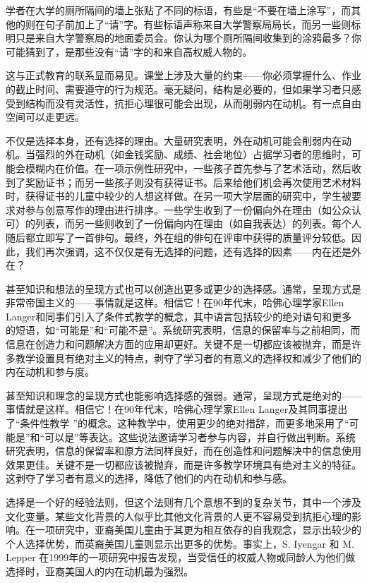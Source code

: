 学者在大学的厕所隔间的墙上张贴了不同的标语，有些是“不要在墙上涂写”，而其他的则在句子前加上了“请”字。有些标语声称来自大学警察局局长，而另一些则标明只是来自大学警察局的地面委员会。你认为哪个厕所隔间收集到的涂鸦最多？你可能猜到了，是那些没有“请”字的和来自高权威人物的。

这与正式教育的联系显而易见。课堂上涉及大量的约束——你必须掌握什么、作业的截止时间、需要遵守的行为规范。毫无疑问，结构是必要的，但如果学习者只感受到结构而没有灵活性，抗拒心理很可能会出现，从而削弱内在动机。有一点自由空间可以走更远。

不仅是选择本身，还有选择的理由。大量研究表明，外在动机可能会削弱内在动机。当强烈的外在动机（如金钱奖励、成绩、社会地位）占据学习者的思维时，可能会模糊内在价值。在一项示例性研究中，一些孩子首先参与了艺术活动，然后收到了奖励证书；而另一些孩子则没有获得证书。后来给他们机会再次使用艺术材料时，获得证书的儿童中较少的人想这样做。在另一项大学层面的研究中，学生被要求对参与创意写作的理由进行排序。一些学生收到了一份偏向外在理由（如公众认可）的列表，而另一些则收到了一份偏向内在理由（如自我表达）的列表。每个人随后都立即写了一首俳句。最终，外在组的俳句在评审中获得的质量评分较低。因此，我们再次强调，这不仅仅是有无选择的问题，还有选择的因素——内在还是外在？

甚至知识和想法的呈现方式也可以创造出更多或更少的选择感。通常，呈现方式是非常帝国主义的——事情就是这样。相信它！在90年代末，哈佛心理学家Ellen Langer和同事们引入了条件式教学的概念，其中语言包括较少的绝对语句和更多的短语，如“可能是”和“可能不是”。系统研究表明，信息的保留率与之前相同，而信息在创造力和问题解决方面的应用却更好。关键不是一切都应该被抛弃，而是许多教学设置具有绝对主义的特点，剥夺了学习者的有意义的选择权和减少了他们的内在动机和参与度。

甚至知识和理念的呈现方式也能影响选择感的强弱。通常，呈现方式是绝对的——事情就是这样。相信它！在90年代末，哈佛心理学家Ellen Langer及其同事提出了“条件性教学 ”的概念。这种教学中，使用更少的绝对措辞，而更多地采用了“可能是”和“可以是”等表达。这些说法邀请学习者参与内容，并自行做出判断。系统研究表明，信息的保留率和原方法同样良好，而在创造性和问题解决中的信息使用效果更佳。关键不是一切都应该被抛弃，而是许多教学环境具有绝对主义的特征。这剥夺了学习者有意义的选择，降低了他们的内在动机和参与感。

选择是一个好的经验法则，但这个法则有几个意想不到的复杂关节，其中一个涉及文化变量。某些文化背景的人似乎比其他文化背景的人更不容易受到抗拒心理的影响。在一项研究中，亚裔美国儿童由于其更为相互依存的自我观念，显示出较少的个人选择优势，而英裔美国儿童则显示出更多的优势。事实上，S. Iyengar 和 M. Lepper 在1999年的一项研究中报告发现，当受信任的权威人物或同龄人为他们做选择时，亚裔美国人的内在动机最为强烈。

